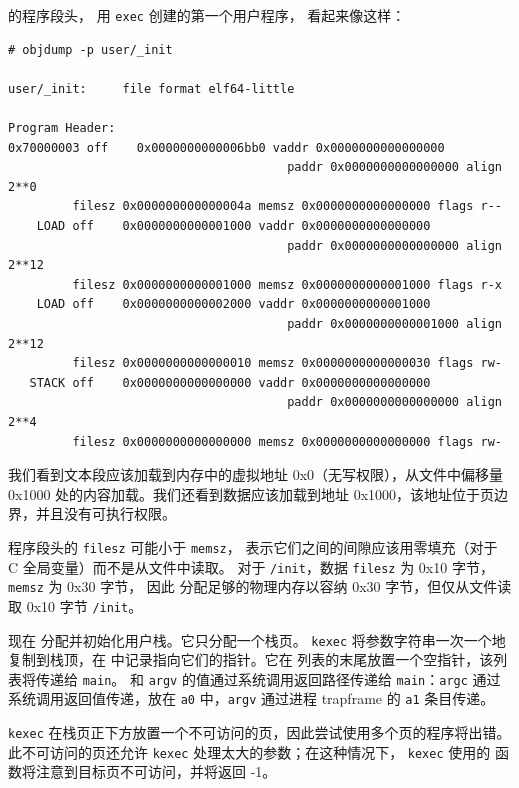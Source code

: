 的程序段头，
用
\lstinline{exec}
创建的第一个用户程序，
看起来像这样：
\begin{footnotesize}
\begin{verbatim}
# objdump -p user/_init

user/_init:     file format elf64-little

Program Header:
0x70000003 off    0x0000000000006bb0 vaddr 0x0000000000000000
                                       paddr 0x0000000000000000 align 2**0
         filesz 0x000000000000004a memsz 0x0000000000000000 flags r--
    LOAD off    0x0000000000001000 vaddr 0x0000000000000000
                                       paddr 0x0000000000000000 align 2**12
         filesz 0x0000000000001000 memsz 0x0000000000001000 flags r-x
    LOAD off    0x0000000000002000 vaddr 0x0000000000001000
                                       paddr 0x0000000000001000 align 2**12
         filesz 0x0000000000000010 memsz 0x0000000000000030 flags rw-
   STACK off    0x0000000000000000 vaddr 0x0000000000000000
                                       paddr 0x0000000000000000 align 2**4
         filesz 0x0000000000000000 memsz 0x0000000000000000 flags rw-
\end{verbatim}
\end{footnotesize}

我们看到文本段应该加载到内存中的虚拟地址 0x0（无写权限），从文件中偏移量 0x1000 处的内容加载。我们还看到数据应该加载到地址 0x1000，该地址位于页边界，并且没有可执行权限。

程序段头的
\lstinline{filesz}
可能小于
\lstinline{memsz}，
表示它们之间的间隙应该用零填充（对于 C 全局变量）而不是从文件中读取。
对于
\lstinline{/init}，数据
\lstinline{filesz}
为 0x10 字节，
\lstinline{memsz}
为 0x30 字节，
因此
分配足够的物理内存以容纳 0x30 字节，但仅从文件读取 0x10 字节
\lstinline{/init}。

现在
分配并初始化用户栈。它只分配一个栈页。
\lstinline{kexec}
将参数字符串一次一个地复制到栈顶，在
中记录指向它们的指针。它在
列表的末尾放置一个空指针，该列表将传递给
\lstinline{main}。
和 \lstinline{argv} 的值通过系统调用返回路径传递给 \lstinline{main}：\lstinline{argc} 通过系统调用返回值传递，放在 {\tt a0} 中，\lstinline{argv} 通过进程 trapframe 的 {\tt a1} 条目传递。

\lstinline{kexec}
在栈页正下方放置一个不可访问的页，因此尝试使用多个页的程序将出错。此不可访问的页还允许
\lstinline{kexec}
处理太大的参数；在这种情况下，
\lstinline{kexec}
使用的
函数将注意到目标页不可访问，并将返回 -1。

